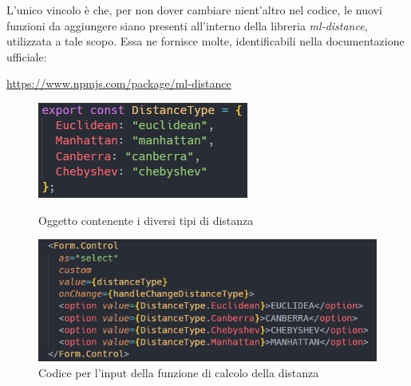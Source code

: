 L'unico vincolo è che, per non dover cambiare nient'altro nel codice, le nuovi funzioni da aggiungere siano presenti all'interno della libreria \textit{ml-distance}, utilizzata a tale scopo. Essa ne fornisce molte, identificabili nella documentazione ufficiale:  
\begin{center}
	\textcolor{blue}{\url{https://www.npmjs.com/package/ml-distance}}
\end{center}


\begin{figure}[!htb]
	\includegraphics[width=\linewidth]{Images/oggdistance}
	\caption{Oggetto contenente i diversi tipi di distanza}
	\label{distancetype}
\endminipage\hfill
{}
	\includegraphics[width=\linewidth]{Images/calcdistance}
	\caption{Codice per l'input della funzione di calcolo della distanza}
	\label{distanceoption}
\endminipage
\end{figure}

\newpage 
